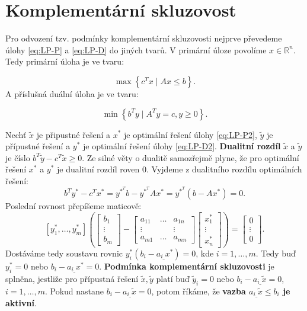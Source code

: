 \section{Komplementární skluzovost}

Pro odvození tzv. podmínky komplementární skluzovosti nejprve převedeme úlohy \ref{eq:LP-P} a \ref{eq:LP-D} do jiných tvarů. V primární úloze povolíme $x \in \mathbb{R}^n$. Tedy primární úloha je ve tvaru:

\begin{equation}\tag{LP-P2}
    \max \left\{ c^T x \mid Ax \leq b \right\}.
    \label{eq:LP-P2}
\end{equation}
A příslušná duální úloha je ve tvaru:

\begin{equation}\tag{LP-D2}
    \min \left\{ b^T y \mid A^T y = c, y \geq 0 \right\}.
    \label{eq:LP-D2}
\end{equation}

Nechť $\tilde{x}$ je připustné řešení a $x^*$ je optimální řešení úlohy \ref{eq:LP-P2}, $\tilde{y}$ je přípustné řešení a $y^*$ je optimální řešení úlohy \ref{eq:LP-D2}. \textbf{Dualitní rozdíl} $\tilde{x}$ a $\tilde{y}$ je číslo $b^T \tilde{y} - c^T \tilde{x} \geq 0$. Ze silné věty o dualitě samozřejmě plyne, že pro optimální řešení $x^*$ a $y^*$ je dualitní rozdíl roven $0$. Vyjdeme z dualitního rozdílu optimálních řešení:
$$
    b^T y^* - c^T x^* = y^{*^T} b - y^{*^T} A x^* = y^{*^T} \left( b - A x^* \right) = 0.
$$
Poslední rovnost přepíšeme maticově:
$$
    \left[ y_1^*, \dots, y_m^* \right] \left(
        \begin{bmatrix}
            b_1    \\
            \vdots \\
            b_m
        \end{bmatrix}
        -
        \begin{bmatrix}
            a_{11} & \dots & a_{1n} \\
            \vdots & \     & \vdots \\
            a_{m1} & \dots & a_{mn}
        \end{bmatrix}
        \begin{bmatrix}
            x_1^*  \\
            \vdots \\
            x_n^*
        \end{bmatrix}
    \right)
    =
    \begin{bmatrix}
    0      \\
    \vdots \\
    0
    \end{bmatrix}.
$$
Dostáváme tedy soustavu rovnic $y_i^* \left( b_i - a_{i\_} x^* \right) = 0$, kde $i = 1, \dots, m$. Tedy buď $y_i^* = 0$ nebo $ b_i - a_{i\_} x^* = 0$. \textbf{Podmínka komplementární skluzovosti} je splněna, jestliže pro přípustná řešení $\tilde{x}, \tilde{y}$ platí buď $\tilde{y}_i = 0$ nebo $b_i - a_{i\_} \tilde{x} = 0$, $i = 1, \dots, m$. Pokud nastane $b_i - a_{i\_} \tilde{x} = 0$, potom říkáme, že \textbf{vazba $a_{i\_} \tilde{x} \leq b_i$ je aktivní}.


